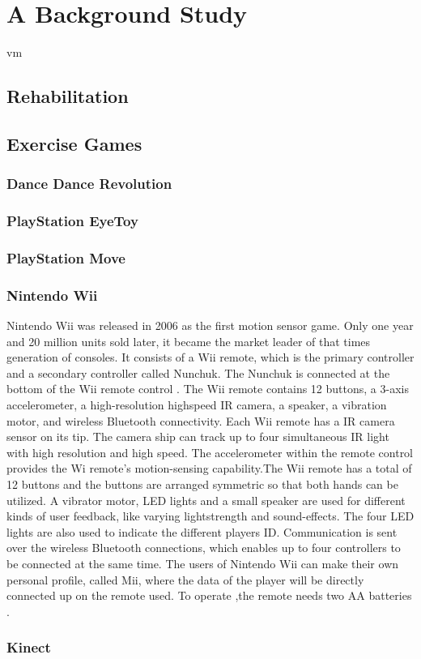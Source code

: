 \chapter{A Background Study}
\ac{vm}
\section{Rehabilitation}
\section{Exercise Games}
\subsection{Dance Dance Revolution}
\subsection{PlayStation EyeToy}
\subsection{PlayStation Move}
\subsection{Nintendo Wii}
Nintendo Wii was released in 2006 as the first motion sensor game. Only one year and 20 million units sold later, it became the market leader of  that times generation of consoles. It consists of a Wii remote, which is the primary controller and a secondary controller called Nunchuk. The Nunchuk is connected at the bottom of the Wii remote control \cite{wii} \cite{hackingwii}. The Wii remote contains 12 buttons, a 3-axis accelerometer, a high-resolution highspeed IR camera, a speaker, a vibration motor, and wireless Bluetooth connectivity.
Each Wii remote has a IR camera sensor on its tip. The camera ship can track up to four simultaneous IR light with high resolution and high speed. The accelerometer within the remote control provides the Wi remote’s motion-sensing capability.The Wii remote has a total of 12 buttons and the buttons are arranged symmetric so that both hands can be utilized. A vibrator motor, LED lights and a small speaker are used for different kinds of user feedback, like varying lightstrength and sound-effects. The four LED lights are also used to indicate the different players ID. Communication is sent over the wireless Bluetooth connections, which enables up to four controllers to be connected at the same time.  The users of Nintendo Wii can make their own personal profile, called Mii, where the data of the player will be directly connected up on the remote used. To operate ,the remote needs two AA batteries \cite{hackingwii} \cite{whatiswii}. 
\subsection{Kinect}